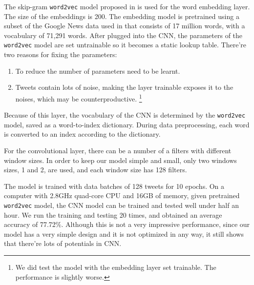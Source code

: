 The skip-gram {\tt word2vec} model proposed in \cite{mikolov2013} is used for the word embedding layer. The size of the embeddings is 200. The embedding model is pretrained using a subset of the Google News data used in \cite{mikolov2013} that consists of 17 million words, with a vocabulary of 71,291 words. After plugged into the CNN, the parameters of the {\tt word2vec} model are set untrainable so it becomes a static lookup table. There're two reasons for fixing the parameters:
\begin{enumerate}
\item To reduce the number of parameters need to be learnt.
\item Tweets contain lots of noise, making the layer trainable exposes it to the noises, which may be counterproductive. \footnote{We did test the model with the embedding layer set trainable. The performance is slightly worse.}
\end{enumerate}
Because of this layer, the vocabulary of the CNN is determined by the {\tt word2vec} model, saved as a word-to-index dictionary. During data preprocessing, each word is converted to an index according to the dictionary. 

For the convolutional layer, there can be a number of a filters with different window sizes. In order to keep our model simple and small, only two windows sizes, 1 and 2, are used, and each window size has 128 filters. 

The model is trained with data batches of 128 tweets for 10 epochs. On a computer with 2.8GHz quad-core CPU and 16GB of memory, given pretrained {\tt word2vec} model, the CNN model can be trained and tested well under half an hour. We run the training and testing 20 times, and obtained an average accuracy of 77.72\%. Although this is not a very impressive performance, since our model has a very simple design and it is not optimized in any way, it still shows that there're lots of potentials in CNN.